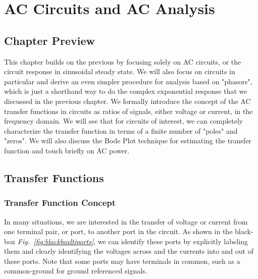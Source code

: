 \chapter{AC Circuits and AC Analysis}
\label{ch:ch02_AC}
\graphicspath{{./figs_AC/}}
\section{Chapter Preview}
This chapter builds on the previous by focusing solely on AC circuits, or the circuit response in sinusoidal steady state.  We will also focus on circuits in particular and derive an even simpler procedure for analysis based on "phasors", which is just a shorthand way to do the complex exponential response that we discussed in the previous chapter.  We formally introduce the concept of the AC transfer functions in circuits as ratios of signals, either voltage or current, in the frequency domain.  We will see that for circuits of interest, we can completely characterize the transfer function in terms of a finite number of "poles" and "zeros".  We will also discuss the Bode Plot technique for estimating the transfer function and touch briefly on AC power.
\section{Transfer Functions}
\subsection{Transfer Function Concept}
In many situations, we are interested in the transfer of voltage or current from one terminal pair, or port, to another port in the circuit.  As shown in the black-box \emph{Fig.~\ref{fig:blackboxltiports}}, we can identify these ports by explicitly labeling them and clearly identifying the voltages across and the currents into and out of these ports.  Note that some ports may have terminals in common, such as a common-ground for ground referenced signals.  

